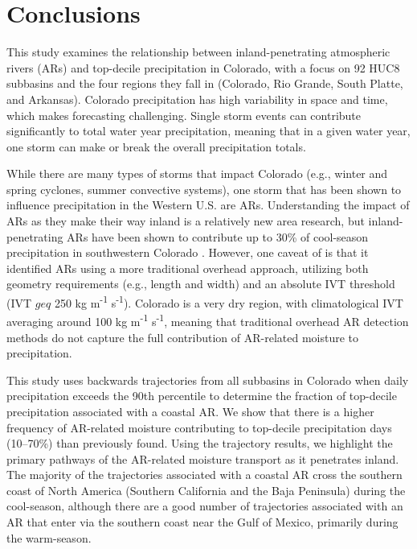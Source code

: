 \documentclass[draft]{agujournal2019}
\begin{document}
\section{Conclusions}
\label{conclusions}
This study examines the relationship between inland-penetrating atmospheric rivers (ARs) and top-decile precipitation in Colorado, with a focus on 92 HUC8 subbasins and the four regions they fall in (Colorado, Rio Grande, South Platte, and Arkansas). Colorado precipitation has high variability in space and time, which makes forecasting challenging. Single storm events can contribute significantly to total water year precipitation, meaning that in a given water year, one storm can make or break the overall precipitation totals. 

While there are many types of storms that impact Colorado (e.g., winter and spring cyclones, summer convective systems), one storm that has been shown to influence precipitation in the Western U.S. are ARs. Understanding the impact of ARs as they make their way inland is a relatively new area research, but inland-penetrating ARs have been shown to contribute up to 30\% of cool-season precipitation in southwestern Colorado \cite{Rutz2014}. However, one caveat of  is that it identified ARs using a more traditional overhead approach, utilizing both geometry requirements (e.g., length and width) and an absolute IVT threshold (IVT $geq$ 250 kg m\textsuperscript{-1} s\textsuperscript{-1}). Colorado is a very dry region, with climatological IVT averaging around 100 kg m\textsuperscript{-1} s\textsuperscript{-1}, meaning that traditional overhead AR detection methods do not capture the full contribution of AR-related moisture to precipitation. 

This study uses backwards trajectories from all subbasins in Colorado when daily precipitation exceeds the 90th percentile to determine the fraction of top-decile precipitation associated with a coastal AR. We show that there is a higher frequency of AR-related moisture contributing to top-decile precipitation days (10--70\%) than previously found. Using the trajectory results, we highlight the primary pathways of the AR-related moisture transport as it penetrates inland. The majority of the trajectories associated with a coastal AR cross the southern coast of North America (Southern California and the Baja Peninsula) during the cool-season, although there are a good number of trajectories associated with an AR that enter via the southern coast near the Gulf of Mexico, primarily during the warm-season.  
\end{document}
